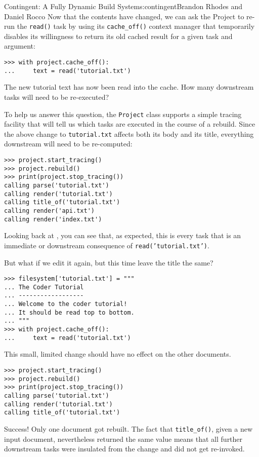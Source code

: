 \begin{aosachapter}{Contingent: A Fully Dynamic Build System}{s:contingent}{Brandon Rhodes and Daniel Rocco}
Now that the contents have changed, we can ask the Project to re-run the
\texttt{read()} task by using its \texttt{cache\_off()} context manager
that temporarily disables its willingness to return its old cached
result for a given task and argument:

\begin{verbatim}
>>> with project.cache_off():
...     text = read('tutorial.txt')
\end{verbatim}

The new tutorial text has now been read into the cache. How many
downstream tasks will need to be re-executed?

To help us answer this question, the \texttt{Project} class supports a
simple tracing facility that will tell us which tasks are executed in
the course of a rebuild. Since the above change to \texttt{tutorial.txt}
affects both its body and its title, everything downstream will need to
be re-computed:

\begin{verbatim}
>>> project.start_tracing()
>>> project.rebuild()
>>> print(project.stop_tracing())
calling parse('tutorial.txt')
calling render('tutorial.txt')
calling title_of('tutorial.txt')
calling render('api.txt')
calling render('index.txt')
\end{verbatim}

Looking back at , you can see that,
as expected, this is every task that is an immediate or downstream
consequence of \texttt{read('tutorial.txt')}.

But what if we edit it again, but this time leave the title the same?

\begin{verbatim}
>>> filesystem['tutorial.txt'] = """
... The Coder Tutorial
... ------------------
... Welcome to the coder tutorial!
... It should be read top to bottom.
... """
>>> with project.cache_off():
...     text = read('tutorial.txt')
\end{verbatim}

This small, limited change should have no effect on the other documents.

\begin{verbatim}
>>> project.start_tracing()
>>> project.rebuild()
>>> print(project.stop_tracing())
calling parse('tutorial.txt')
calling render('tutorial.txt')
calling title_of('tutorial.txt')
\end{verbatim}

Success! Only one document got rebuilt. The fact that
\texttt{title\_of()}, given a new input document, nevertheless returned
the same value means that all further downstream tasks were insulated
from the change and did not get re-invoked.


\end{aosachapter}
